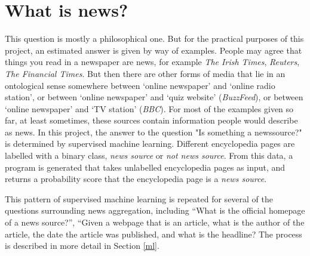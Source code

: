 \section{What is news?}
This question is mostly a philosophical one.  But for the practical
purposes of this project, an estimated answer is given by way of examples.
People may agree that things you read in a newspaper are news,
for example {\it The Irish Times}, {\it Reuters}, {\it The Financial
Times}.  But then there are other forms of media that lie in
an ontological sense somewhere between `online newspaper' and
`online radio station', or between `online newspaper' and
`quiz website' ({\it BuzzFeed}), or between `online newspaper' and
`TV station' ({\it BBC}).  For most of the examples given so far, at least
sometimes, these sources contain information people would describe as
news.  In this project, the answer to the question "Is something a
newssource?" is determined by supervised machine learning.  Different
encyclopedia pages are labelled with a binary class, {\it news source} or
{\it not news source}.  From this data, a program is generated that
takes unlabelled encyclopedia pages as input, and returns a probability
score that the encyclopedia page is a {\it news source}.

This pattern of supervised machine learning is repeated for several of the
questions surrounding news aggregation, including ``What is the
official homepage of a news source?'', ``Given a webpage that is an
article, what is the author of the article, the date the article was
published, and what is the headline?  The process is described in
more detail in Section \ref{ml}.